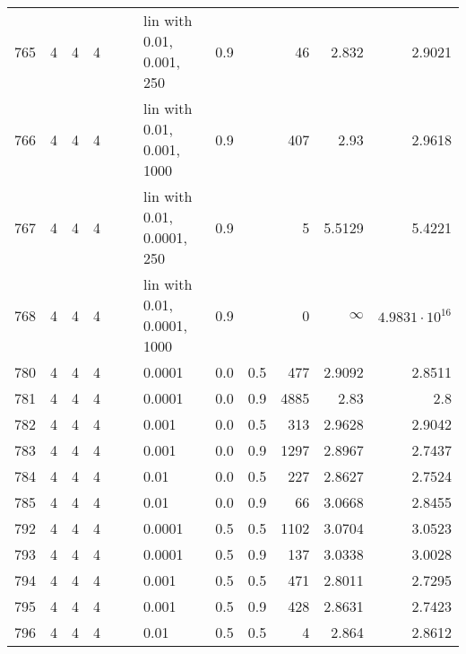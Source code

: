 \begin{longtable}{lrrrrrlrrrrr}
 765 &       4 & 4 & 4 &   &   &   lin with 0.01, 0.001, 250 &  0.9 &        &      46 &                  2.832 &                 2.9021 \\
 766 &       4 & 4 & 4 &   &   &  lin with 0.01, 0.001, 1000 &  0.9 &        &     407 &                   2.93 &                 2.9618 \\
 767 &       4 & 4 & 4 &   &   &  lin with 0.01, 0.0001, 250 &  0.9 &        &       5 &                 5.5129 &                 5.4221 \\
 768 &       4 & 4 & 4 &   &   & lin with 0.01, 0.0001, 1000 &  0.9 &        &       0 &               $\infty$ &  $4.9831\cdot 10^{16}$ \\
 780 &       4 & 4 & 4 &   &   &                      0.0001 &  0.0 &    0.5 &     477 &                 2.9092 &                 2.8511 \\
 781 &       4 & 4 & 4 &   &   &                      0.0001 &  0.0 &    0.9 &    4885 &                   2.83 &                    2.8 \\
 782 &       4 & 4 & 4 &   &   &                       0.001 &  0.0 &    0.5 &     313 &                 2.9628 &                 2.9042 \\
 783 &       4 & 4 & 4 &   &   &                       0.001 &  0.0 &    0.9 &    1297 &                 2.8967 &                 2.7437 \\
 784 &       4 & 4 & 4 &   &   &                        0.01 &  0.0 &    0.5 &     227 &                 2.8627 &                 2.7524 \\
 785 &       4 & 4 & 4 &   &   &                        0.01 &  0.0 &    0.9 &      66 &                 3.0668 &                 2.8455 \\
 792 &       4 & 4 & 4 &   &   &                      0.0001 &  0.5 &    0.5 &    1102 &                 3.0704 &                 3.0523 \\
 793 &       4 & 4 & 4 &   &   &                      0.0001 &  0.5 &    0.9 &     137 &                 3.0338 &                 3.0028 \\
 794 &       4 & 4 & 4 &   &   &                       0.001 &  0.5 &    0.5 &     471 &                 2.8011 &                 2.7295 \\
 795 &       4 & 4 & 4 &   &   &                       0.001 &  0.5 &    0.9 &     428 &                 2.8631 &                 2.7423 \\
 796 &       4 & 4 & 4 &   &   &                        0.01 &  0.5 &    0.5 &       4 &                  2.864 &                 2.8612 \\

\end{longtable}

